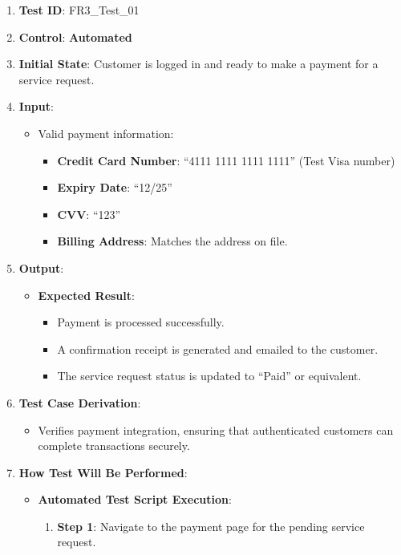 \documentclass[12pt, titlepage]{article}
\begin{document}
\begin{enumerate}
    \item \textbf{Test ID}: FR3\_Test\_01
    \item \textbf{Control}: \textbf{Automated}
    \item \textbf{Initial State}: Customer is logged in and ready to make a payment for a service request.
    \item \textbf{Input}:
    \begin{itemize}
        \item Valid payment information:
        \begin{itemize}
            \item \textbf{Credit Card Number}: ``4111 1111 1111 1111'' (Test Visa number)
            \item \textbf{Expiry Date}: ``12/25''
            \item \textbf{CVV}: ``123''
            \item \textbf{Billing Address}: Matches the address on file.
        \end{itemize}
    \end{itemize}
    \item \textbf{Output}:
    \begin{itemize}
        \item \textbf{Expected Result}:
        \begin{itemize}
            \item Payment is processed successfully.
            \item A confirmation receipt is generated and emailed to the customer.
            \item The service request status is updated to ``Paid'' or equivalent.
        \end{itemize}
    \end{itemize}
    \item \textbf{Test Case Derivation}:
    \begin{itemize}
        \item Verifies payment integration, ensuring that authenticated customers can complete transactions securely.
    \end{itemize}
    \item \textbf{How Test Will Be Performed}:
    \begin{itemize}
        \item \textbf{Automated Test Script Execution}:
        \begin{enumerate}
            \item \textbf{Step 1}: Navigate to the payment page for the pending service request.

\end{enumerate}
\end{itemize}
\end{enumerate}
\end{document}
